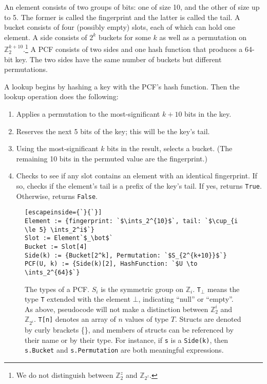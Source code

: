 \documentclass[letterpaper, 11pt]{article}
\newcommand{\ints}{\mathbb{Z}}
\begin{document}
An element consists of two groups of bits: one of size 10, and the other of size up to 5.
The former is called the fingerprint and the latter is called the tail.
A bucket consists of four (possibly empty) slots, each of which can hold one element.
A side consists of $2^k$ buckets for some $k$ as well as a permutation on $\ints_2^{k+10}$.\footnote{We do not distinguish between $\ints_2^z$ and $\ints_{2^z}$.}
A PCF consists of two sides and one hash function that produces a 64-bit key.
The two sides have the same number of buckets but different permutations.

A lookup begins by hashing a key with the PCF's hash function.
Then the lookup operation does the following:

\begin{enumerate}
\item Applies a permutation to the most-significant $k+10$ bits in the key.
\item Reserves the next 5 bits of the key; this will be the key's tail.
\item Using the most-significant $k$ bits in the result, selects a bucket.
(The remaining 10 bits in the permuted value are the fingerprint.)
\item Checks to see if any slot contains an element with an identical fingerprint.
If so, checks if the element's tail is a prefix of the key's tail.
If yes, returns \verb|True|.
Otherwise, returns \verb|False|.
\end{enumerate}

\begin{figure}
\begin{lstlisting}[escapeinside={`}{`}]
Element := {fingerprint: `$\ints_2^{10}$`, tail: `$\cup_{i \le 5} \ints_2^i$`}
Slot := Element`$_\bot$`
Bucket := Slot[4]
Side(k) := {Bucket[2^k], Permutation: `$S_{2^{k+10}}$`}
PCF(U, k) := {Side(k)[2], HashFunction: `$U \to \ints_2^{64}$`}
\end{lstlisting}
\caption{\protect
The types of a PCF.
  $S_i$ is the symmetric group on $\ints_i$.
  \texttt{T}$_\bot$ means the type \texttt{T} extended with the element $\bot$, indicating ``null'' or ``empty''.
  As above, pseudocode will not make a distinction between $\ints_2^i$ and $\ints_{2^i}$.
  \texttt{T[n]} denotes an array of $n$ values of type $T$.
  Structs are denoted by curly brackets \{\}, and members of structs can be referenced by their name or by their type.
  For instance, if \texttt{s} is a \texttt{Side(k)}, then \texttt{s.Bucket} and \texttt{s.Permutation} are both meaningful expressions.
}
\end{figure}
\end{document}
